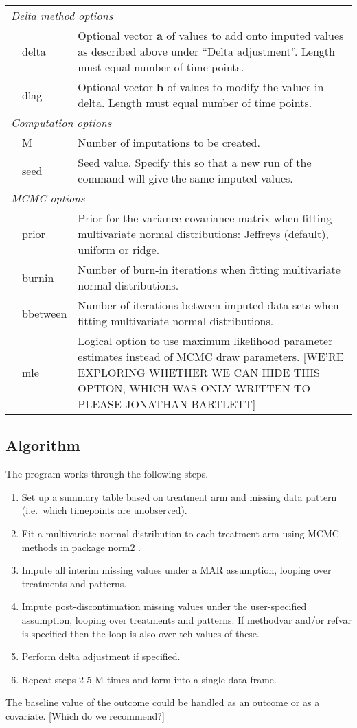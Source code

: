 \begin{tabular}{llp{.8\linewidth}}
\multicolumn{3}{l}{\em Delta method options}\\
& delta 	&	 Optional vector $\boldsymbol{a}$ of values to add onto imputed values as described above under ``Delta adjustment''. Length must equal number of time points.\\
& dlag 	&	 Optional vector $\boldsymbol{b}$ of values to modify the values in delta. Length must equal number of time points. \\

\multicolumn{3}{l}{\em Computation options}\\
& M 	&	 Number of imputations to be created. \\
& seed 	&	 Seed value. Specify this so that a new run of the command will give the same imputed values.	\\

\multicolumn{3}{l}{\em MCMC options} \\
& prior 	&	 Prior for the variance-covariance matrix when fitting multivariate normal distributions: Jeffreys (default), uniform or ridge.	\\
& burnin 	&	 Number of burn-in iterations when fitting multivariate normal distributions.	\\
& bbetween 	&	 Number of iterations between imputed data sets when fitting multivariate normal distributions.	\\
& mle 	&	 Logical option to use maximum likelihood parameter estimates instead of MCMC draw parameters. 
[WE'RE EXPLORING WHETHER WE CAN HIDE THIS OPTION, WHICH WAS ONLY WRITTEN TO PLEASE JONATHAN BARTLETT]	\\ \hline
\end{tabular}

\subsection{Algorithm}

The program works through the following steps.
\begin{enumerate}
\item Set up a summary table based on treatment arm and missing data pattern (i.e.\ which timepoints are unobserved).
\item Fit a multivariate normal distribution to each treatment arm using MCMC methods in package norm2 \citep{norm2}.
\item Impute all interim missing values under a MAR assumption, looping over treatments and patterns.
\item Impute post-discontinuation missing values under the user-specified assumption, looping over treatments and patterns. If methodvar and/or refvar is specified then the loop is also over teh values of these.
\item Perform delta adjustment if specified.
\item Repeat steps 2-5 M times and form into a single data frame.
\end{enumerate}
The baseline value of the outcome could be handled as an outcome or as a covariate. 
[Which do we recommend?] 

